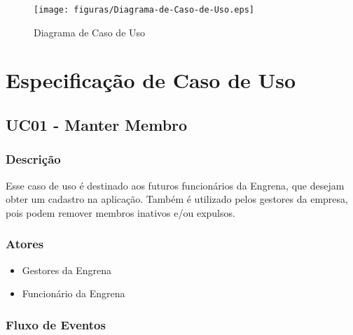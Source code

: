 \begin{apendicesenv}
\begin{figure}[htb]
	\centering
	\label{figura_Diagrama-de-Caso-de-Uso}
		\texttt{[image: figuras/Diagrama-de-Caso-de-Uso.eps]}
	\caption{Diagrama de Caso de Uso}
\end{figure}

\clearpage{}





























\chapter{Especificação de Caso de Uso}
\label{especificação_de_caso_de_uso}


\section{UC01 - Manter Membro}

\subsection{Descrição}

Esse caso de uso é destinado aos futuros funcionários da Engrena, que desejam obter um cadastro na aplicação. Também é utilizado pelos gestores da empresa, pois podem remover membros inativos e/ou expulsos.

\subsection{Atores}

\begin{itemize}
  \item{Gestores da Engrena}
  \item{Funcionário da Engrena}
\end{itemize}

\subsection{Fluxo de Eventos}


\end{apendicesenv}

